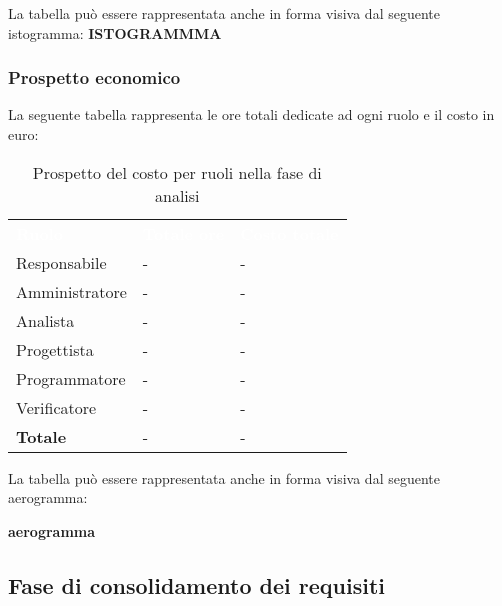 La tabella può essere rappresentata anche in forma visiva dal seguente istogramma: \textbf{ISTOGRAMMMA}

\subsubsection{Prospetto economico}
La seguente tabella rappresenta le ore totali dedicate ad ogni ruolo e il costo in euro:

\begin{table}[!htbp]
\begin{center}
\renewcommand{\arraystretch}{1.5}
\begin{tabular}{ m{}<{\centering}  m{}<{\centering} m{}<{\centering}}
	\rowcolor{darkblue}
	\textcolor{white}{\textbf{Ruolo}}&\textcolor{white}{\textbf{Totale ore}}&\textcolor{white}{\textbf{Costo totale}}\\ 

	Responsabile  & - & - \\	

	Amministratore & - & - \\
	
	Analista & - & - \\
	
	Progettista & - & - \\
	
	Programmatore & - & - \\
	
	Verificatore & - & - \\
	
	\textbf{Totale} & - & - \\
	
\end{tabular}
\caption{Prospetto del costo per ruoli nella fase di analisi}
\end{center}
\end{table}

La tabella può essere rappresentata anche in forma visiva dal seguente aerogramma:

\textbf{aerogramma}



\subsection{Fase di consolidamento dei requisiti}
